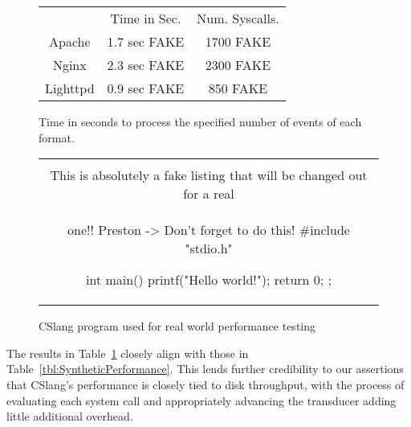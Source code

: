 \begin{figure}
  \begin{tabular}{|c|c|c}
                & Time in Sec. & Num. Syscalls.\\
  Apache        & 1.7 sec FAKE & 1700 FAKE      \\
  Nginx         & 2.3 sec FAKE & 2300 FAKE      \\
  Lighttpd      & 0.9 sec FAKE & 850  FAKE      \\
\end{tabular}
\caption{Time in seconds to process the specified number of events of each format.}
\label{tbl:RealWorldPerformance}
\end{figure}

\begin{figure}[H]
\centering
\begin{tabular}{c}
\begin{lstlisting}
\\ This is absolutely a fake listing that will be changed out for a real
\\ one!!  Preston -> Don't forget to do this!
#include "stdio.h"

int main() {
    printf("Hello world!\n");
    return 0;
};
\end{lstlisting}
\end{tabular}
\caption{CSlang program used for real world performance testing}
\label{lst:RealWorldPerformance}
\end{figure}

The results in Table~\ref{tbl:RealWorldPerformance} closely align with
those in Table~\ref{tbl:SyntheticPerformance}.  This lends further
credibility to our assertions that CSlang's performance is closely tied to
disk throughput, with
the process of evaluating each system call and appropriately advancing the
transducer adding little additional overhead.
